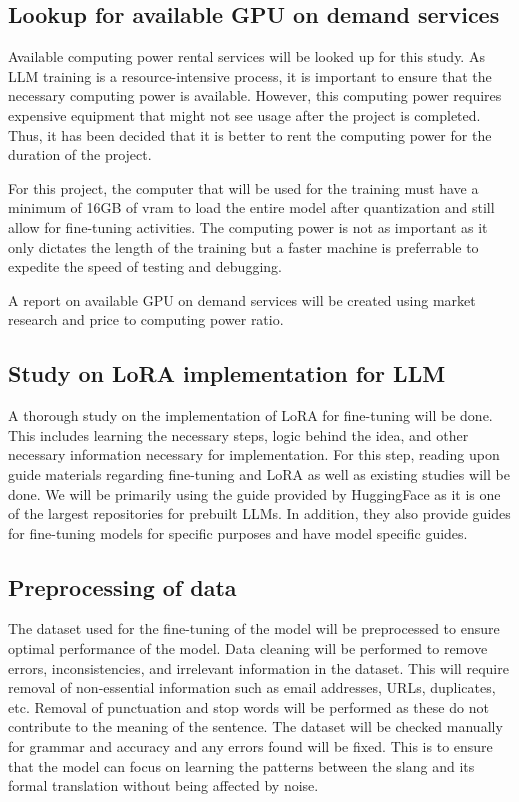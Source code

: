 \subsection{Lookup for available GPU on demand services} 
Available computing power rental services will be looked up for this study.
As LLM training is a resource-intensive process, it is important to ensure that the necessary computing power is available.
However, this computing power requires expensive equipment that might not see usage after the project is completed.
Thus, it has been decided that it is better to rent the computing power for the duration of the project.

For this project, the computer that will be used for the training must have a minimum of 16GB of vram to load the entire model after quantization and still allow for fine-tuning activities. The computing power is not as important as it only dictates the length of the training but a faster machine is preferrable to expedite the speed of testing and debugging.

A report on available GPU on demand services will be created using market research and price to computing power ratio.

\subsection{Study on LoRA implementation for LLM}
A thorough study on the implementation of LoRA for fine-tuning will be done.
This includes learning the necessary steps, logic behind the idea, and other necessary information necessary for implementation.
For this step, reading upon guide materials regarding fine-tuning and LoRA as well as existing studies will be done.
We will be primarily using the guide provided by HuggingFace as it is one of the largest repositories for prebuilt LLMs.
In addition, they also provide guides for fine-tuning models for specific purposes and have model specific guides.

\subsection{Preprocessing of data} 
The dataset used for the fine-tuning of the model will be preprocessed to ensure optimal performance of the model.
Data cleaning will be performed to remove errors, inconsistencies, and irrelevant information in the dataset.
This will require removal of non-essential information such as email addresses, URLs, duplicates, etc.
Removal of punctuation and stop words will be performed as these do not contribute to the meaning of the sentence.
The dataset will be checked manually for grammar and accuracy and any errors found will be fixed. 
This is to ensure that the model can focus on learning the patterns between the slang and its formal translation without being affected by noise.

